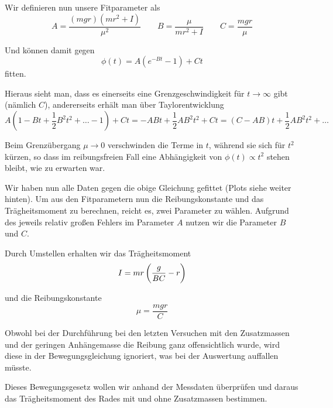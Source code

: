 \documentclass[a4paper,german,12pt,smallheadings]{scrartcl}
\begin{document}
Wir definieren nun unsere Fitparameter als
\begin{equation}
  A = \frac{(mgr)(mr^2+I)}{\mu^2} \qquad
  B = \frac{\mu}{mr^2+I} \qquad
  C = \frac{mgr}{\mu}
\end{equation}

Und können damit gegen
\begin{equation}
  \phi(t) = A(e^{-Bt} -1) + Ct
\end{equation}
fitten.

Hieraus sieht man, dass es einerseits eine Grenzgeschwindigkeit für $t \to
\infty$ gibt (nämlich $C$), andererseits erhält man über Taylorentwicklung
\begin{equation}
  A(1-Bt+\frac{1}{2}B^2t^2 + \dots - 1) + Ct = -ABt+\frac{1}{2}AB^2t^2 + Ct = (C-AB)t+ \frac{1}{2}AB^2 t^2 + \dots
\end{equation}

Beim Grenzübergang $\mu \to 0$ verschwinden die Terme in $t$, während sie sich
für $t^2$ kürzen, so dass im reibungsfreien Fall eine Abhängigkeit von $\phi(t)
\propto t^2$ stehen bleibt, wie zu erwarten war.

Wir haben nun alle Daten gegen die obige Gleichung gefittet (Plots siehe weiter
hinten). Um aus den Fitparametern nun die Reibungskonstante und das
Trägheitsmoment zu berechnen, reicht es, zwei Parameter zu wählen. Aufgrund des
jeweils relativ großen Fehlers im Parameter $A$ nutzen wir die Parameter $B$
und $C$.

Durch Umstellen erhalten wir das Trägheitsmoment
\begin{equation}
  I = mr \del{\frac{g}{BC} - r}
\end{equation}

und die Reibungskonstante
\begin{equation}
  \mu = \frac{mgr}{C}
\end{equation}

Obwohl bei der Durchführung bei den letzten Versuchen mit den
Zusatzmassen und der geringen Anhängemasse die Reibung ganz offensichtlich
wurde, wird diese in der Bewegungsgleichung ignoriert, was bei der Auswertung
auffallen müsste.


Dieses Bewegungsgesetz wollen wir anhand der Messdaten überprüfen und daraus
das Trägheitsmoment des Rades mit und ohne Zusatzmassen bestimmen.

\end{document}
